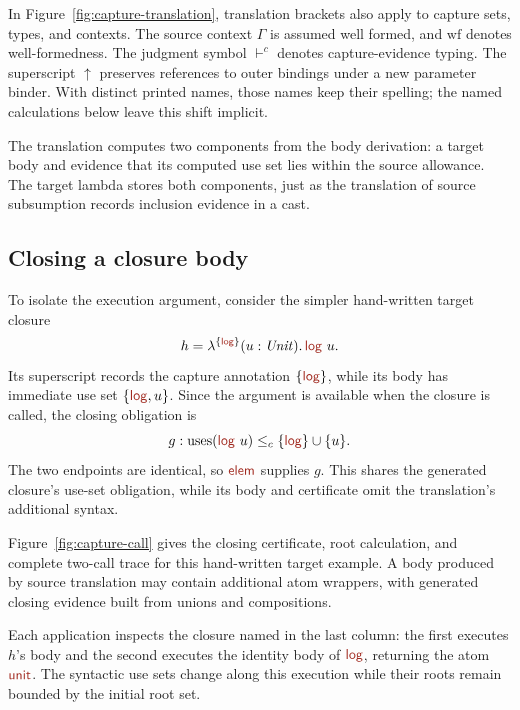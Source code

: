 In Figure~\ref{fig:capture-translation}, translation brackets also apply
to capture sets, types, and contexts. The source context $\Gamma$ is
assumed well formed, and $\mathrm{wf}$ denotes well-formedness.
The judgment symbol $\vdash^c$ denotes capture-evidence typing. The superscript
$\uparrow$ preserves references to outer bindings under a new parameter
binder. With distinct printed names, those names keep their spelling;
the named calculations below leave this shift implicit.

The translation computes two components from the body derivation: a
target body and evidence that its computed use set lies within the source
allowance. The target lambda stores both components, just as the
translation of source subsumption records inclusion evidence in a cast.




\FloatBarrier


\subsection*{Closing a closure body}
To isolate the execution argument, consider the simpler hand-written
target closure
\[
 h=\lambda^{\{\ev{log}\}}(u:\ty{Unit}).\,\ev{log}\ u.
\]
Its superscript records the capture annotation $\{\ev{log}\}$, while
its body has immediate use set $\{\ev{log},u\}$. Since the argument is
available when the closure is called, the closing obligation is
\[
 g:\uses{\ev{log}\ u}\le_c\{\ev{log}\}\cup\{u\}.
\]
The two endpoints are identical, so $\ev{elem}$ supplies $g$.
This shares the generated closure's use-set obligation, while its body
and certificate omit the translation's additional syntax.

Figure~\ref{fig:capture-call} gives the closing certificate, root
calculation, and complete two-call trace for this hand-written target
example. A body produced by source translation may contain additional
atom wrappers, with generated closing evidence built from unions and
compositions.





Each application inspects the closure named in the last column: the
first executes $h$'s body and the second executes the identity body of
$\ev{log}$, returning the atom $\ev{unit}$. The syntactic use sets change
along this execution while their roots remain bounded by the initial root set.

